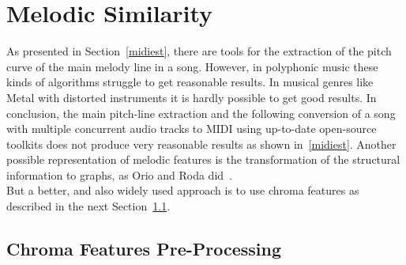 \section{Melodic Similarity}\label{melsimc}

As presented in Section~\ref{midiest}, there are tools for the extraction of the pitch curve of the main melody line in a song. However, in polyphonic music these kinds of algorithms struggle to get reasonable results. %
In musical genres like Metal with distorted instruments it is hardly possible to get good results. 
In conclusion, the main pitch-line extraction and the following conversion of a song with multiple concurrent audio tracks to MIDI using up-to-date open-source toolkits does not produce very reasonable results as shown in~\ref{midiest}.
Another possible representation of melodic features is the transformation of the structural information to graphs, as Orio and Roda did~\cite{graph1}.\\ 
But a better, and also widely used approach is to use chroma features as described in the next Section~\ref{chromafeat}.

\subsection{Chroma Features Pre-Processing}\label{chromafeat}

